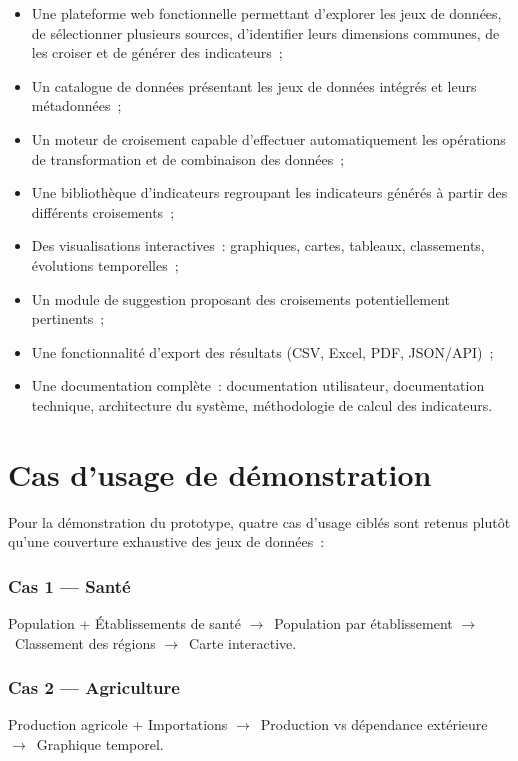 \documentclass[11pt,a4paper]{article}
\newcommand{\arrowto}{$\rightarrow$}
\begin{document}
\begin{itemize}
  \item Une plateforme web fonctionnelle permettant d'explorer les jeux de données, de sélectionner plusieurs sources, d'identifier leurs dimensions communes, de les croiser et de générer des indicateurs~;
  \item Un catalogue de données présentant les jeux de données intégrés et leurs métadonnées~;
  \item Un moteur de croisement capable d'effectuer automatiquement les opérations de transformation et de combinaison des données~;
  \item Une bibliothèque d'indicateurs regroupant les indicateurs générés à partir des différents croisements~;
  \item Des visualisations interactives~: graphiques, cartes, tableaux, classements, évolutions temporelles~;
  \item Un module de suggestion proposant des croisements potentiellement pertinents~;
  \item Une fonctionnalité d'export des résultats (CSV, Excel, PDF, JSON/API)~;
  \item Une documentation complète~: documentation utilisateur, documentation technique, architecture du système, méthodologie de calcul des indicateurs.
\end{itemize}

\section{Cas d'usage de démonstration}

Pour la démonstration du prototype, quatre cas d'usage ciblés sont retenus plutôt qu'une couverture exhaustive des jeux de données~:

\subsubsection*{Cas 1 --- Santé}
Population + Établissements de santé \arrowto\ Population par établissement \arrowto\ Classement des régions \arrowto\ Carte interactive.

\subsubsection*{Cas 2 --- Agriculture}
Production agricole + Importations \arrowto\ Production vs dépendance extérieure \arrowto\ Graphique temporel.
\end{document}
